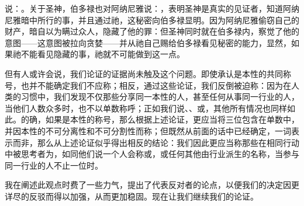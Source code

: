 说：。\newline{}关于圣神，伯多禄也对阿纳尼雅说：，表明圣神是真实的见证者，知道阿纳尼雅暗中所行的事，并且通过祂，这秘密向伯多禄显明。因为阿纳尼雅偷窃自己的财产，暗自以为瞒过众人，隐藏了他的罪：但圣神同时就在伯多禄内，察觉了他的意图——这意图被拉向贪婪——并从祂自己赐给伯多禄看见秘密的能力，显然，如果祂不能看见隐藏的事，祂就不可能做到这一点。\par

但有人或许会说，我们论证的证据尚未触及这个问题。即使承认是本性的共同称号，也并不能确定我们不应称；相反，通过这些论证，我们反倒被迫称：因为在人类的习惯中，我们发现不仅那些分享同一本性的人，甚至任何从事同一行业的人，当他们人数众多时，也不以单数称呼；正如我们说、、或，其他所有情况也同样如此。的确，如果是本性的称号，那么根据上述论证，更应当将三位包含在单数中，并因本性的不可分离性和不可分割性而称；但既然从前面的话中已经确定，一词表示而非，那么从上述论证似乎得出相反的结论：我们因此更应当称那些在相同行动中被思考者为，如同他们说一个人会称或，或任何其他由行业派生的名称，当参与同一行业的人不止一位时。\par

我在阐述此观点时费了一些力气，提出了代表反对者的论点，以便我们的决定因更详尽的反驳而得以加强，从而更加稳固。现在让我们继续我们的论证。\par


